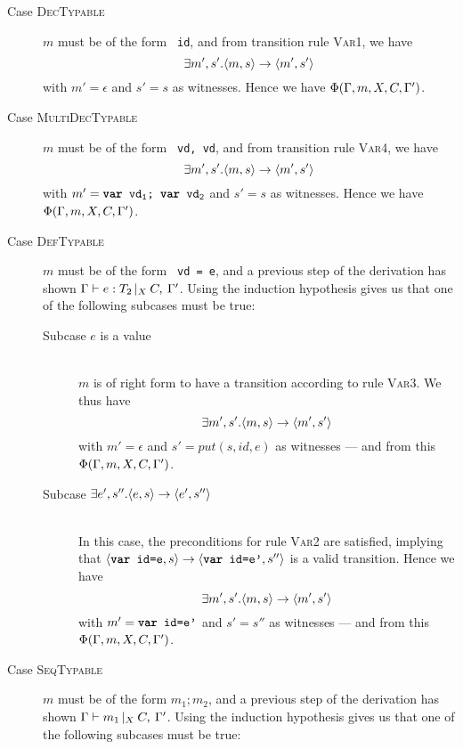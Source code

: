 \documentclass[a4paper]{article}
\begin{document}
	\begin{description}
		\item[Case \textsc{DecTypable}] \hfill 

			$m$ must be of the form \texttt{\var\ id}, and from transition
			rule \textsc{Var1}, we have 
			$$\exists m', s'.\langle{}m,s\rangle{}\rightarrow{}\langle{}m',s'\rangle$$
			with $m'=\epsilon$ and $s'=s$ as witnesses. Hence we have $\Phi(\Gamma, m, X, C, \Gamma')$.

		\item[Case \textsc{MultiDecTypable}] \hfill

			$m$ must be of the form \texttt{\var\ vd, vd}, and from
			transition rule \textsc{Var4}, we have 
			$$\exists m', s'.\langle{}m,s\rangle{}\rightarrow{}\langle{}m',s'\rangle$$
			with $m' = \texttt{\var\ vd\sub{1}; \var\ vd\sub{2}}$ and $s'=s$ as 
			witnesses. Hence we have $\Phi(\Gamma, m, X, C, \Gamma')$.

		\item[Case \textsc{DefTypable}] \hfill
			
			$m$ must be of the form \texttt{\var\ vd = e}, and a previous step
			of the derivation has shown $\Gamma{}\vdash e: T_2\,|_X\:C,\:\Gamma'$. Using the induction hypothesis
			gives us that one of the following subcases must be true:

			\begin{description}
				\item[Subcase $e$ is a value] \hfill \\
					
					$m$ is of right form to have a transition according to
					rule \textsc{Var3}. We thus have 
					$$\exists m', s'.\langle{}m,s\rangle{}\rightarrow{}\langle{}m',s'\rangle$$
					with $m'=\epsilon$ and $s'=put(s,id,e)$ as witnesses ---
					and from this $\Phi(\Gamma, m, X, C, \Gamma')$.
					
				\item[Subcase $\exists e', s''.\langle{}e,s\rangle{}\rightarrow{}\langle{}e',s''\rangle$] \hfill \\

					In this case, the preconditions for rule \textsc{Var2} are
					satisfied, implying that 
					$\transition{\texttt{\var\ id=e}}{s}{\texttt{\var\ id=e'}}{s''}$
					is a valid transition. Hence we have
					$$\exists m', s'.\langle{}m,s\rangle{}\rightarrow{}\langle{}m',s'\rangle$$
					with $m'=\texttt{\textbf{var}\ id=e'}$ and $s'=s''$ as witnesses ---
					and from this $\Phi(\Gamma, m, X, C, \Gamma')$.
			\end{description}

		\item[Case \textsc{SeqTypable}] \hfill
			
			$m$ must be of the form $m_1;m_2$, and a previous step of the
			derivation has shown $\Gamma{}\vdash m_1\, |_X \:C ,\:\Gamma '$. Using the induction
			hypothesis gives us that one of the following subcases must be
			true:


\end{description}
\end{document}
